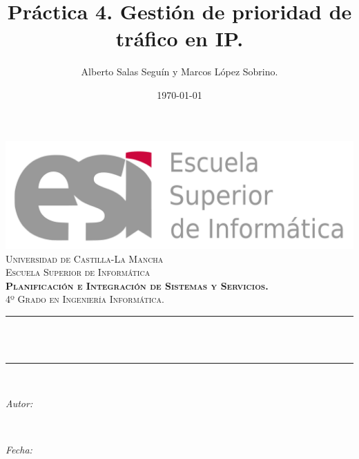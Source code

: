\documentclass[11pt]{article}
\title{Práctica 4. Gestión de prioridad de tráfico en IP.}							%
\author{Alberto Salas Seguín y Marcos López Sobrino.}							%
\date{\today}											%
\makeatletter
\newcommand{\subject}{Planificación e Integración de Sistemas y Servicios.}						%
\newcommand{\course}{4º Grado en Ingeniería Informática.}		%
\newcommand{\dateText}{Fecha:}
\newcommand{\dateText}{Date:}
\let\thetitle\@title
\let\theauthor\@author
\let\thedate\@date
\makeatother
\begin{document}
\begin{titlepage}
	\centering
    \includegraphics[scale = 0.25]{esilogo.png}\\[1.0 cm]	%
    \textsc{\LARGE Universidad de Castilla-La Mancha}\\[0.5 cm]	%
    \textsc{\LARGE Escuela Superior de Informática}\\[2.0 cm]
	\textsc{\Large \textbf{\subject}}\\[0.5 cm]				%
	\textsc{\large \course}\\[0.5 cm]						%
	\rule{\linewidth}{0.2 mm} \\[0.4 cm]
	{ \huge \bfseries \thetitle}\\
	\rule{\linewidth}{0.2 mm} \\[1.5 cm]
	
	\begin{minipage}{0.4\textwidth}
		\begin{flushleft} \large
			\emph{Autor:}\\
			\textbf{\theauthor}
			\end{flushleft}
			\end{minipage}~
			\begin{minipage}{0.4\textwidth}
			\begin{flushright} \large
			\emph{\dateText} \\
			\thedate
		\end{flushright}
	\end{minipage}\\[1.5 cm]
 
	\vfill
	
\end{titlepage}
\end{document}
